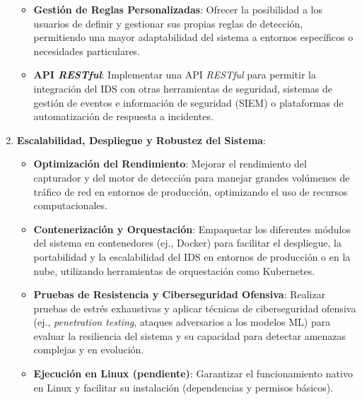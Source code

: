 \begin{enumerate}
\begin{itemize}
        \item\textbf{Gestión de Reglas Personalizadas}: Ofrecer la posibilidad a los usuarios de definir y gestionar sus propias reglas de detección, permitiendo una mayor adaptabilidad del sistema a entornos específicos o necesidades particulares.
        
        \item\textbf{API \textit{RESTful}}: Implementar una API \textit{RESTful} para permitir la integración del IDS con otras herramientas de seguridad, sistemas de gestión de eventos e información de seguridad (SIEM) o plataformas de automatización de respuesta a incidentes.

    \end{itemize}
    
    \item\textbf{Escalabilidad, Despliegue y Robustez del Sistema}:

    \begin{itemize}
 
        \item\textbf{Optimización del Rendimiento}: Mejorar el rendimiento del capturador y del motor de detección para manejar grandes volúmenes de tráfico de red en entornos de producción, optimizando el uso de recursos computacionales.
        
        \item\textbf{Contenerización y Orquestación}: Empaquetar los diferentes módulos del sistema en contenedores (ej., Docker) para facilitar el despliegue, la portabilidad y la escalabilidad del IDS en entornos de producción o en la nube, utilizando herramientas de orquestación como Kubernetes.
        
        \item\textbf{Pruebas de Resistencia y Ciberseguridad Ofensiva}: Realizar pruebas de estrés exhaustivas y aplicar técnicas de ciberseguridad ofensiva (ej., \textit{penetration testing}, ataques adversarios a los modelos ML) para evaluar la resiliencia del sistema y su capacidad para detectar amenazas complejas y en evolución.
        
       \item\textbf{Ejecución en Linux (pendiente)}: Garantizar el funcionamiento nativo en Linux y facilitar su instalación (dependencias y permisos básicos).
        
    \end{itemize}

\end{enumerate}